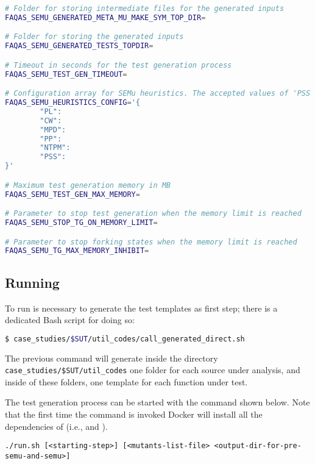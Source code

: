 \begin{lstlisting}[language=bash,label=listing:SEMUS:conf,caption=faqas\_semus\_conf.sh file.]
# Folder for storing intermediate files for the generated inputs 
FAQAS_SEMU_GENERATED_META_MU_MAKE_SYM_TOP_DIR=

# Folder for storing the generated inputs 
FAQAS_SEMU_GENERATED_TESTS_TOPDIR=

# Timeout in seconds for the test generation process
FAQAS_SEMU_TEST_GEN_TIMEOUT=

# Configuration array for SEMu heuristics. The accepted values of 'PSS' are 'RND' for random and 'MDO' for minimum distance to output
FAQAS_SEMU_HEURISTICS_CONFIG='{
        "PL": 
        "CW": 
        "MPD": 
        "PP": 
        "NTPM": 
        "PSS": 
}'

# Maximum test generation memory in MB
FAQAS_SEMU_TEST_GEN_MAX_MEMORY=

# Parameter to stop test generation when the memory limit is reached
FAQAS_SEMU_STOP_TG_ON_MEMORY_LIMIT=

# Parameter to stop forking states when the memory limit is reached
FAQAS_SEMU_TG_MAX_MEMORY_INHIBIT=

\end{lstlisting}



\subsection{Running \SEMUS}
\label{sec:semuslaunch}

To run \SEMUS is necessary to generate the test templates as first step; there is a dedicated Bash script for doing so:

\begin{lstlisting}[language=bash]
 $ case_studies/$SUT/util_codes/call_generated_direct.sh
\end{lstlisting}

The previous command will generate inside the directory \texttt{case\_studies/\$SUT/util\_codes} one folder for each source under analysis, and inside of these folders, one template for each function under test.

The test generation process can be started with the command shown below. Note that the first time the command is invoked Docker will install all the dependencies of \SEMUS (i.e., \SEMU and \MASS).

\begin{lstlisting}[language={}]
./run.sh [<starting-step>] [<mutants-list-file> <output-dir-for-pre-semu-and-semu>]
\end{lstlisting}

